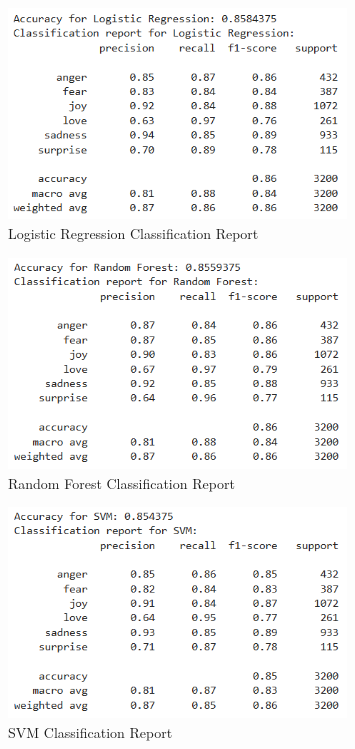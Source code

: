 \begin{figure}[h!]
\centering
\includegraphics[width=0.8\textwidth]{images/logistic_regression_result.png}
\caption{Logistic Regression Classification Report}
\label{fig:logistic_regression}
\end{figure}

\begin{figure}[h!]
\centering
\includegraphics[width=0.8\textwidth]{images/random_forest_result.png}
\caption{Random Forest Classification Report}
\label{fig:random_forest}
\end{figure}

\begin{figure}[h!]
\centering
\includegraphics[width=0.8\textwidth]{images/svm_result.png}
\caption{SVM Classification Report}
\label{fig:svm}
\end{figure}


